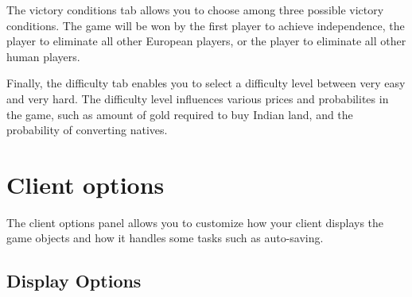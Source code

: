 \documentclass[12pt]{book}
\begin{document}
The victory conditions tab allows you to choose among three possible
victory conditions. The game will be won by the first player to
achieve independence, the player to eliminate all other European
players, or the player to eliminate all other human players.

Finally, the difficulty tab enables you to select a difficulty level
between very easy and very hard. The difficulty level influences
various prices and probabilites in the game, such as amount of gold
required to buy Indian land, and the probability of converting
natives.


\hypertarget{Client options}{\section{Client options}}

The client options panel allows you to customize how your client
displays the game objects and how it handles some tasks such as
auto-saving.

\hypertarget{display options}{\subsection{Display Options}}
\end{document}
